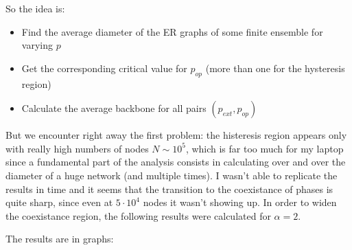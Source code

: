So the idea is:
\begin{itemize}
    \item Find the average diameter of the ER graphs of some finite ensemble for varying $p$
    \item Get the corresponding critical value for $p_{op}$ (more than one for the hysteresis region)
    \item Calculate the average backbone for all pairs $(p_{ext}, p_{op})$
\end{itemize}
But we encounter right away the first problem: the histeresis region appears only with really high numbers of nodes $N \sim 10^5$, which is far too much for my laptop since a fundamental part of the analysis consists in calculating over and over the diameter of a huge network (and multiple times). I wasn't able to replicate the results in time and it seems that the transition to the coexistance of phases is quite sharp, since even at $5\cdot 10^4$ nodes it wasn't showing up.
In order to widen the coexistance region, the following results were calculated for $\alpha=2$.

The results are in graphs:

\newpage